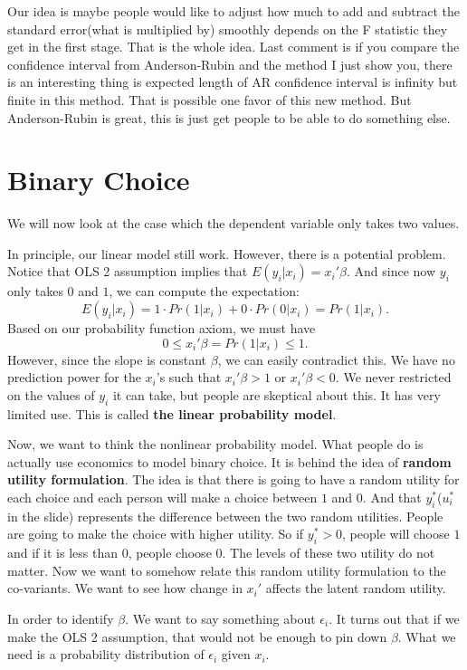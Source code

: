 \documentclass[11pt,a4paper]{amsart}
\theoremstyle{plain}
\theoremstyle{definition}
\begin{document}
	Our idea is maybe people would like to adjust how much to add and subtract the standard error(what is multiplied by) smoothly depends on the F statistic they get in the first stage. That is the whole idea. Last comment is if you compare the confidence interval from Anderson-Rubin and the method I just show you, there is an interesting thing is expected length of AR confidence interval is inﬁnity but finite in this method. That is possible one favor of this new method. But Anderson-Rubin is great, this is just get people to be able to do something else.
\section{Binary Choice}
	We will now look at the case which the dependent variable only takes two values.\par 
	In principle, our linear model still work. However, there is a potential problem. Notice that OLS 2 assumption implies that $E(y_{i}|x_{i}) = x_{i}' \beta$. And since now $y_{i}$ only takes $0$ and $1$, we can compute the expectation:
	\[	E(y_{i}|x_{i}) = 1 \cdot Pr(1|x_{i}) + 0 \cdot Pr(0 | x_{i}) = Pr(1|x_{i}) .	\]
	Based on our probability function axiom, we must have 
	\[	 0  \leq x_{i}' \beta = Pr(1|x_{i}) \leq  1.	\]
	However, since the slope is constant $\beta$, we can easily contradict this. We have no prediction power for the $x_{i}$'s such that $x_{i}' \beta > 1$ or $x_{i}' \beta < 0$. We never restricted on the values of $y_{i}$ it can take, but people are skeptical about this. It has very limited use. This is called \textbf{the linear probability model}.\par 
	Now, we want to think the nonlinear probability model. What people do is actually use economics to model binary choice. It is behind the idea of \textbf{random utility formulation}. The idea is that there is going to have a random utility for each choice and each person will make a choice between $1$ and $0$. And that $y_{i}^{*}$($u_{i}^{*}$ in the slide) represents the difference between the two random utilities.  People are going to make the choice with higher utility. So if $y_{i}^{*} > 0$, people will choose $1$ and if it is less than $0$, people choose $0$. The levels of these two utility do not matter. Now we want to somehow relate this random utility formulation to the co-variants. We want to see how change in $x_{i}'$ affects the latent random utility. \par 
	In order to identify $\beta$. We want to say something about $\epsilon_{i}$. It turns out that if we make the OLS 2 assumption, that would not be enough to pin down $\beta$. What we need is a probability distribution of $\epsilon_{i}$ given $x_{i}$.
\end{document}
